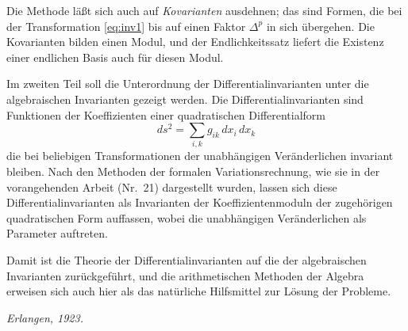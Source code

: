 \documentclass[fontsize=10pt,paper=a5,pagesize,headings=small]{scrbook}
\theoremstyle{plain}
\begin{document}
Die Methode läßt sich auch auf \textit{Kovarianten} ausdehnen; das sind Formen,
die bei der Transformation \eqref{eq:inv1} bis auf einen Faktor $\Delta^p$ in sich
übergehen. Die Kovarianten bilden einen Modul, und der Endlichkeitssatz
liefert die Existenz einer endlichen Basis auch für diesen Modul.

Im zweiten Teil soll die Unterordnung der Differentialinvarianten unter die
algebraischen Invarianten gezeigt werden. Die Differentialinvarianten sind
Funktionen der Koeffizienten einer quadratischen Differentialform
\[ ds^2 = \sum_{i,k} g_{ik}\, dx_i\, dx_k \]
die bei beliebigen Transformationen der unabhängigen Veränderlichen invariant
bleiben. Nach den Methoden der formalen Variationsrechnung, wie sie in der
vorangehenden Arbeit (Nr.~21) dargestellt wurden, lassen sich diese Differential\-invarianten
als Invarianten der Koeffizientenmoduln der zugehörigen quadratischen
Form auffassen, wobei die unabhängigen Veränderlichen als Parameter auftreten.

Damit ist die Theorie der Differentialinvarianten auf die der algebraischen
Invarianten zurückgeführt, und die arithmetischen Methoden der Algebra erweisen
sich auch hier als das natürliche Hilfsmittel zur Lösung der Probleme.

\vfill
\begin{flushright}
\textit{Erlangen, 1923.}
\end{flushright}
\end{document}

